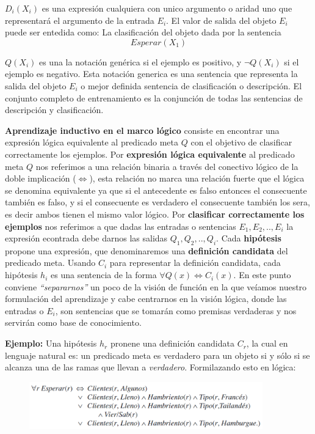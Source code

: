 \documentclass[12 pt, a4paper]{article}
\begin{document}
		\(D_{i}(X_{i})\) es una expresión cualquiera con unico argumento o aridad uno que representará el argumento de la entrada \(E_{i}\). El valor de salida del objeto \(E_{i}\) puede ser entedida como: La clasificación del objeto dada por la sentencia
			\[Esperar(X_{1})\]
			
		\(Q(X_{i})\) es una la notación genérica si el ejemplo es positivo, y \(\neg Q(X_{i})\) si el ejemplo es negativo. Esta notación generica es una sentencia que representa la salida del objeto \(E_{i}\) o mejor definida sentencia de clasificación o descripción. El conjunto completo de entrenamiento es la conjunción de todas las sentencias de descripción y clasificación.
		
		\textbf{Aprendizaje inductivo en el marco lógico} consiste en encontrar una expresión lógica equivalente al predicado meta \(Q\) con el objetivo de clasificar correctamente los ejemplos. Por \textbf{expresión lógica equivalente} al predicado meta \(Q\) nos referimos a una relación binaria a través del conectivo lógico de la doble implicación (\(\iff\)), esta relación no marca una relación fuerte que el lógica se denomina equivalente ya que si el antecedente es falso entonces el consecuente también es falso, y si el consecuente es verdadero el consecuente también los sera, es decir ambos tienen el mismo valor lógico. Por \textbf{clasificar correctamente los ejemplos} nos referimos a que dadas las entradas o sentencias \(E_{1}, E_{2},..,E_{i}\) la expresión econtrada debe darnos las salidas \(Q_{1},Q_{2},..,Q_{i}\). Cada \textbf{hipótesis} propone una expresión, que denominaremos una \textbf{definición candidata} del predicado meta. Usando \(C_{i}\) para representar la definición candidata, cada hipótesis \(h_{i}\) es una sentencia de la forma \(\forall Q(x) \iff C_{i}(x)\). En este punto conviene \emph{``separarnos''} un poco de la visión de función en la que veíamos nuestro formulación del aprendizaje y cabe centrarnos en la visión lógica, donde las entradas o \(E_{i}\), son sentencias que se tomarán como premisas verdaderas y nos servirán como base de conocimiento. 
		\begin{center}
			\textbf{Ejemplo:} Una hipótesis \(h_{r}\) pronene una definición candidata \(C_{r}\), la cual en lenguaje natural es: un predicado meta es verdadero para un objeto si y sólo si se alcanza una de las ramas que llevan a \emph{verdadero}. Formilazando esto en lógica:
		\end{center}
		\begin{figure}[h]
			\centering
			\includegraphics[width=0.9\textwidth]{candidateDefinition.png}
		\end{figure}
\end{document}
